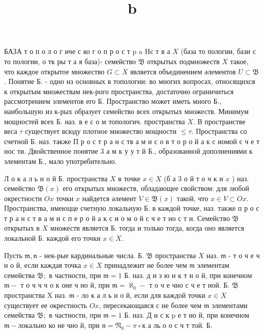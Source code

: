 \documentclass[10pt]{article}
\title{$\mathbf{b}$ }
\author{}
\date{}
\begin{document}
\maketitle

БАЗА т о п о л о г иче с ко г о п р о с т p a Hс т в а $X$ (база то пологии, бази с то пологии, о тк ры т а я база)- семейство $\mathfrak{B}$ открытых подмножеств $X$ такое, что каждое открытое множество $G \subset X$ является объединением әлементов $U \subset \mathfrak{B}$. Понятие Б. - одно из основных в топологии: во многих вопросах, относящихся к открытым множествам нек-рого пространства, достаточно ограничиться рассмотрением элементов его Б. Пространство может иметь много Б., наибольшую из к-рых образует семейство всех открытых множеств. Минимум мощностей всех Б. наз. в е с о м топологич. пространства $X$. В пространстве веса $\tau$ существует всюду плотное множество мощности $\leqslant \tau$. Пространства со счетной Б. наз. также П р о с т р а н с тв а м и с о в т о р о й а к с иомой с ч е т нос ти. Двойственное понятие 3 а м к у у т й Б., образованной дополнениями к элементам Б., мало употребительно.



Л о к а л ь н о й Б. пространства $X$ в точке $x \in X$ (б а 3 о й т о ч к и $x$ ) наз. семейство $\mathfrak{B}(x)$ его открытых множеств, обладающее свойством: для любой окрестности $O x$ точки $x$ найдется әлемент $V \in \mathfrak{B}(x)$ такой, что $x \in V \subset O x$. Пространства, имеюцце счетную локальную Б. в каждой точке, наз. также п р о с т р а н с т в а м и с п е р о й а к с и о м о й с ч е т но с т и. Семейство $\mathfrak{B}$ открытых в $X$ множеств является Б. тогда и только тогда, когда оно является локальной Б. каждой его точки $x \in X$.



Пусть $\mathfrak{m}, \mathfrak{n}$ - нек-рые кардинальные числа. Б. $\mathfrak{B}$ пространства $X$ наз. $\mathfrak{m}$ - т о ч е ч н о й, если каждая точка $x \in X$ принадлежит не более чем $\mathfrak{m}$ элементам семейства $\mathfrak{B} ;$ в частности, при $\mathfrak{m}=1$ Б. наз. д и з ю н к т н о й, при конечном $\mathfrak{m}-$ т о ч ч ч о к оне ч но й, при $\mathfrak{m}=\boldsymbol{\aleph}_{0}-$ т о ч е чно с ч е т ной. Б. $\mathfrak{B}$ пространства X наз. $\mathfrak{m}$ - ло к а л ь н о й, если для каждой точки $x \in X$ существует ее окрестность $O x$, пересекающаяся с не более чем $\mathfrak{m}$ элементами семейства $\mathfrak{B} ;$ в частности, при $\mathfrak{m}=1$ Б. наз. Д и с к $\mathrm{p}$ е т но й, при конечном $\mathfrak{m}-л о к а л ь н о$ ко не чно й, при $\mathfrak{n}=\mathfrak{N}_{0}-\pi \circ к$ а ль о $о$ с ч т той. Б.
\end{document}
